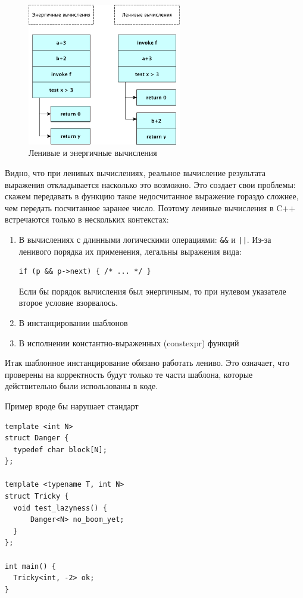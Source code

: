 \documentclass[a4paper,12pt,oneside]{book}
\begin{document}
\begin{figure}[h!]
\centering
\includegraphics[width=0.6\textwidth]{illustrations/lazyorder-crop.pdf}
\caption{Ленивые и энергичные вычисления}
\label{fig:lazy_calc}
\end{figure}

Видно, что при ленивых вычислениях, реальное вычисление результата выражения откладывается насколько это возможно. Это создает свои проблемы: скажем передавать в функцию такое недосчитанное выражение гораздо сложнее, чем передать посчитанное заранее число. Поэтому ленивые вычисления в C++ встречаются только в нескольких контекстах:

\begin{enumerate}
\item В вычислениях с длинными логическими операциями: \lstinline!&&! и \lstinline!||!. Из-за ленивого порядка их применения, легальны выражения вида:
\begin{lstlisting}
if (p && p->next) { /* ... */ }
\end{lstlisting}
Если бы порядок вычисления был энергичным, то при нулевом указателе второе условие взорвалось.
\item В инстанцировании шаблонов
\item В исполнении константно-выраженных (constexpr) функций
\end{enumerate}

Итак шаблонное инстанцирование обязано работать лениво. Это означает, что проверены на корректность будут только те части шаблона, которые действительно были использованы в коде.

Пример вроде бы нарушает стандарт

\begin{lstlisting}
template <int N>
struct Danger {
  typedef char block[N]; 
};

template <typename T, int N>
struct Tricky {
  void test_lazyness() {
      Danger<N> no_boom_yet;
  }
};

int main() {
  Tricky<int, -2> ok;
}
\end{lstlisting}
\end{document}
